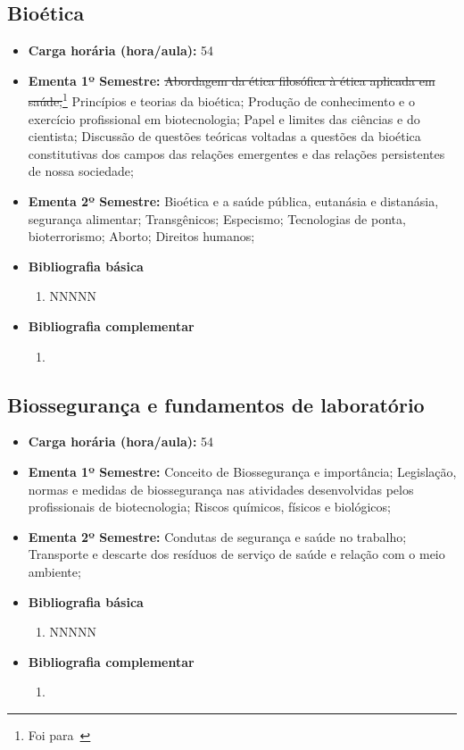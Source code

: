 \documentclass[11pt,fleqn]{book} %
\begin{document}
\subsection{Bioética}\label{disc:bioetica}
\begin{itemize}
	\item \textbf{Carga horária (hora/aula):} 54
	\item \textbf{Ementa 1º Semestre:} 
	\sout{Abordagem da ética filosófica à ética aplicada em saúde;}\footnote{Foi para~}
	Princípios e teorias da bioética;
	Produção de conhecimento e o exercício profissional em biotecnologia; 
	Papel e limites das ciências e do cientista; 
	Discussão de questões teóricas voltadas a questões da bioética constitutivas dos campos das relações emergentes e das relações persistentes de nossa sociedade; 
	\item \textbf{Ementa 2º Semestre:} 
	Bioética e a saúde pública, eutanásia e distanásia, segurança alimentar; 
	Transgênicos; 
	Especismo; 
	Tecnologias de ponta, bioterrorismo; 
	Aborto;
	Direitos humanos;
	\item \textbf{Bibliografia básica}
	\begin{enumerate}
		\item NNNNN
	\end{enumerate}
	\item \textbf{Bibliografia complementar}
	\begin{enumerate}
		\item 
	\end{enumerate}	
\end{itemize}

\newpage
\subsection{Biossegurança e fundamentos de laboratório}\label{disc:bioseg}
\begin{itemize}
	\item \textbf{Carga horária (hora/aula):} 54
	\item \textbf{Ementa 1º Semestre:} 
	Conceito de Biossegurança e importância; 
	Legislação, normas e medidas de biossegurança nas atividades desenvolvidas pelos profissionais de biotecnologia; 
	Riscos químicos, físicos e biológicos; 
	\item \textbf{Ementa 2º Semestre:} 
	Condutas de segurança e saúde no trabalho; 
	Transporte e descarte dos resíduos de serviço de saúde e relação com o meio ambiente;
	\item \textbf{Bibliografia básica}
	\begin{enumerate}
		\item NNNNN
	\end{enumerate}
	\item \textbf{Bibliografia complementar}
	\begin{enumerate}
		\item 
	\end{enumerate}	
\end{itemize}
\end{document}
